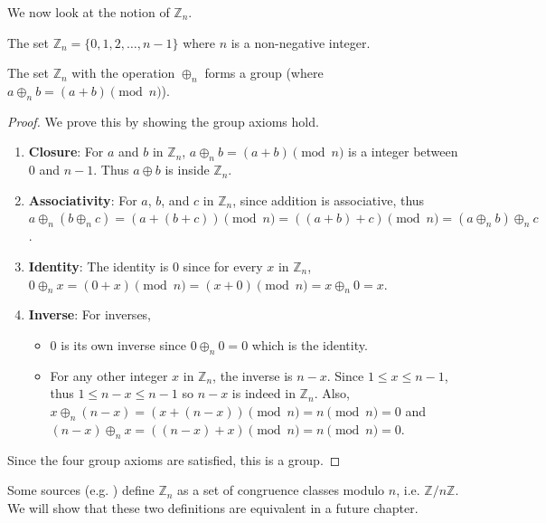 We now look at the notion of $\mathbb{Z}_n$.
\begin{definition}
    The set $\mathbb{Z}_n = \{0, 1, 2, \dots, n-1\}$ where $n$ is a non-negative integer.
\end{definition}
\begin{proposition}
    The set $\mathbb{Z}_n$ with the operation $\oplus_n$ forms a group (where $a \oplus_n b = (a + b) \pmod{n}$).
\end{proposition}
\begin{proof}
    We prove this by showing the group axioms hold.
    \begin{enumerate}
        \item \textbf{Closure}: For $a$ and $b$ in $\mathbb{Z}_n$, $a \oplus_n b = (a + b) \pmod{n}$ is a integer between 0 and $n - 1$. Thus $a \oplus b$ is inside $\mathbb{Z}_n$.
        \item \textbf{Associativity}: For $a$, $b$, and $c$ in $\mathbb{Z}_n$, since addition is associative, thus $a \oplus_n (b \oplus_n c) = (a + (b + c)) \pmod{n} = ((a + b) + c) \pmod{n} = (a \oplus_n b) \oplus_n c$.
        \item \textbf{Identity}: The identity is $0$ since for every $x$ in $\mathbb{Z}_n$, $0 \oplus_n x = (0 + x) \pmod{n} = (x + 0) \pmod{n} = x \oplus_n 0 = x$.
        \item \textbf{Inverse}: For inverses, \begin{itemize}
            \item $0$ is its own inverse since $0 \oplus_n 0 = 0$ which is the identity.
            \item For any other integer $x$ in $\mathbb{Z}_n$, the inverse is $n - x$. Since $1 \leq x \leq n - 1$, thus $1 \leq n - x \leq n - 1$ so $n - x$ is indeed in $\mathbb{Z}_n$. Also, $x \oplus_n (n - x) = (x + (n - x)) \pmod{n} = n \pmod{n} = 0$ and $(n - x) \oplus_n x = ((n-x) + x)\pmod{n} = n \pmod{n} = 0$.
        \end{itemize}
    \end{enumerate}
    Since the four group axioms are satisfied, this is a group.
\end{proof}
\begin{remark}
    Some sources (e.g. \cite{clark_1984, humphreys_1996}) define $\mathbb{Z}_n$ as a set of congruence classes modulo $n$, i.e. $\mathbb{Z}/n\mathbb{Z}$. We will show that these two definitions are equivalent in a future chapter.
\end{remark}

